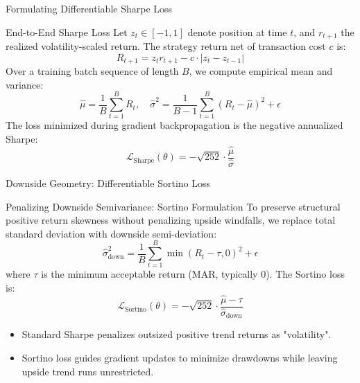 \documentclass[10pt]{beamer}
\begin{document}
\begin{frame}{Formulating Differentiable Sharpe Loss}
  \begin{block}{End-to-End Sharpe Loss}
    Let $z_t \in [-1, 1]$ denote position at time $t$, and $r_{t+1}$ the realized volatility-scaled return. The strategy return net of transaction cost $c$ is:
    \begin{equation*}
      R_{t+1} = z_t r_{t+1} - c \cdot |z_t - z_{t-1}|
    \end{equation*}
    Over a training batch sequence of length $B$, we compute empirical mean and variance:
    \begin{equation*}
      \hat{\mu} = \frac{1}{B} \sum_{t=1}^B R_t, \quad \hat{\sigma}^2 = \frac{1}{B-1} \sum_{t=1}^B (R_t - \hat{\mu})^2 + \epsilon
    \end{equation*}
    The loss minimized during gradient backpropagation is the negative annualized Sharpe:
    \begin{equation*}
      \mathcal{L}_{\text{Sharpe}}(\theta) = -\sqrt{252} \cdot \frac{\hat{\mu}}{\hat{\sigma}}
    \end{equation*}
  \end{block}
\end{frame}

\begin{frame}{Downside Geometry: Differentiable Sortino Loss}
  \begin{block}{Penalizing Downside Semivariance: Sortino Formulation}
    To preserve structural positive return skewness without penalizing upside windfalls, we replace total standard deviation with downside semi-deviation:
    \begin{equation*}
      \hat{\sigma}_{\text{down}}^2 = \frac{1}{B} \sum_{t=1}^B \min(R_t - \tau, 0)^2 + \epsilon
    \end{equation*}
    where $\tau$ is the minimum acceptable return (MAR, typically 0). The Sortino loss is:
    \begin{equation*}
      \mathcal{L}_{\text{Sortino}}(\theta) = -\sqrt{252} \cdot \frac{\hat{\mu} - \tau}{\hat{\sigma}_{\text{down}}}
    \end{equation*}
  \end{block}
  \begin{itemize}\scriptsize
    \item Standard Sharpe penalizes outsized positive trend returns as "volatility".
    \item Sortino loss guides gradient updates to minimize drawdowns while leaving upside trend runs unrestricted.
  \end{itemize}
\end{frame}
\end{document}
